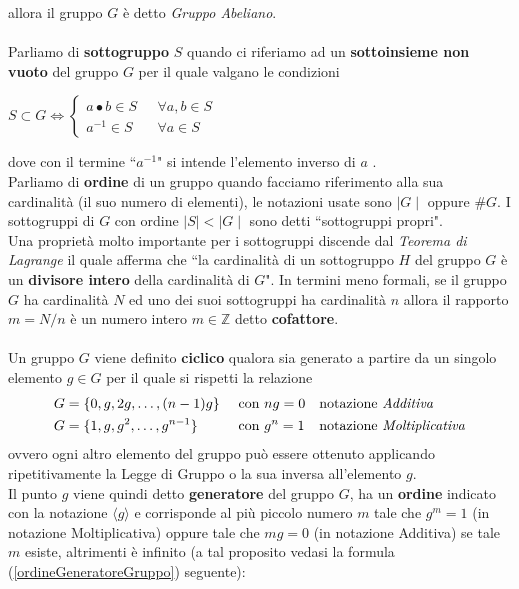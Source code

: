 \documentclass[a4paper,12pt]{tesiinfo}
\begin{document}
allora il gruppo $G$ \`e detto \textit{Gruppo Abeliano}.
\\
\\
Parliamo di \textbf{sottogruppo} $S$ quando ci riferiamo ad un \textbf{sottoinsieme non vuoto} del gruppo $G$ per il quale valgano le condizioni
\begin{center}
$S \subset G \iff
    \begin{cases}
        a \bullet b \in S \text{ } &\forall a, b \in S\\
        a^{-1} \in S \text{ } &\forall a \in S
    \end{cases}$
\end{center}
dove con il termine ``$a^{-1}$" si intende l'elemento inverso di $a$ \cite{baseTheory_GT}.
\\
Parliamo di \textbf{ordine} di un gruppo quando facciamo riferimento alla sua cardinalit\`a (il suo numero di elementi), le notazioni usate sono $\mid G \mid$ oppure $\#G$. I sottogruppi di $G$ con ordine $\mid S \mid < \mid G \mid$ sono detti ``sottogruppi propri".
\\
Una propriet\`a molto importante per i sottogruppi discende dal \textit{Teorema di Lagrange} il quale afferma che ``la cardinalit\`a di un sottogruppo $H$ del gruppo $G$ \`e un \textbf{divisore intero} della cardinalit\`a di $G$". In termini meno formali, se il gruppo $G$ ha cardinalit\`a $N$ ed uno dei suoi sottogruppi ha cardinalit\`a $n$ allora il rapporto $m = N \big / n$ \`e un numero intero $m \in \mathbb{Z}$ detto \textbf{cofattore}.
%
%
%
%
%
%
\\
\\
Un gruppo $G$ viene definito \textbf{ciclico} qualora sia generato a partire da un singolo elemento $g \in G$ per il quale si rispetti la relazione 
\begin{align*}
 &G= \{0, g, 2g, \ldots, (n-1)g\}& \text{ con }&ng=0& &\text{notazione \textit{Additiva}}\\
 &G= \{1, g, g^2, \ldots, g^{n-1}\}& \text{ con }&g^n=1& &\text{notazione \textit{Moltiplicativa}}
\end{align*}
ovvero ogni altro elemento del gruppo pu\`o essere ottenuto applicando ripetitivamente la Legge di Gruppo o la sua inversa all'elemento $g$.\\
Il punto $g$ viene quindi detto \textbf{generatore} del gruppo $G$, ha un \textbf{ordine} indicato con la notazione $\langle g \rangle$ e corrisponde al pi\`u piccolo numero $m$ tale che $g^m = 1$ (in notazione Moltiplicativa) oppure tale che $mg = 0$ (in notazione Additiva) se tale $m$ esiste, altrimenti \`e infinito (a tal proposito vedasi la formula (\ref{ordineGeneratoreGruppo}) seguente):
\end{document}
